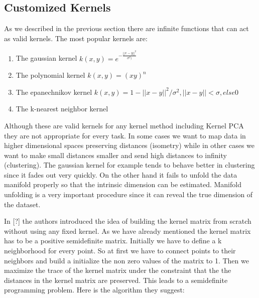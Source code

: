 \documentclass[12pt,letterpaper,doublespaced,ETD,dvips,proposal]{gtthesis}
\begin{document}
\begin{Body}
\subsection{Customized Kernels}

As we described in the previous section there are infinite functions
that can act as valid kernels. The most popular kernels are:
\begin{enumerate}
  \item The gaussian kernel $k(x, y)=e^{-\frac{||x-y||^2}{\sigma^2)}}$
  \item The polynomial kernel $k(x, y)=(xy)^n$
  \item The epanechnikov kernel $k(x, y)=1-||x-y||^2/\sigma^2, ||x-y||<\sigma, else 0$
  \item The k-nearest neighbor kernel
\end{enumerate}

Although these are valid kernels for any kernel method including
Kernel PCA they are not appropriate for every task. In some cases we
want to map data in higher dimensional spaces preserving distances
(isometry) while in other cases we want to make small distances
smaller and send high distances to infinity (clustering). The
gaussian kernel for example tends to behave better in clustering
since it fades out very quickly. On the other hand it fails to
unfold the data manifold properly so that the intrinsic dimension
can be estimated. Manifold unfolding is a very important procedure
since it can reveal the true dimension of the dataset.

In [?] the authors introduced the idea of building the kernel matrix
from scratch without using any fixed kernel. As we have already
mentioned the kernel matrix has to be a positive semidefinite
matrix. Initially we have to define a k neighborhood  for every
point. So at first we have to connect points to their neighbors and
build a initialize the non zero values of the matrix to 1. Then we
maximize the trace of the kernel matrix under the constraint that
the the distances in the kernel matrix are preserved. This leads to
a semidefinite programming problem. Here is the algorithm they
suggest:



\end{Body}
\end{document}
